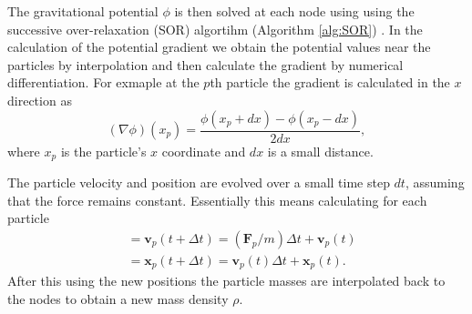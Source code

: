 \documentclass[notitlepage, 12pt]{article}
\begin{document}
The gravitational potential $\phi$ is then solved at each node using using the successive over-relaxation (SOR) algortihm (Algorithm \ref{alg:SOR}) . In the calculation of the potential gradient we obtain the potential values near the particles by interpolation and then calculate the gradient by numerical differentiation. For exmaple at the $p$th particle the gradient is calculated in the $x$ direction as
\begin{equation}
(\nabla \phi)(x_p)=\frac{\phi(x_p+dx)-\phi(x_p-dx)}{2dx},
\end{equation}
where $x_p$ is the particle's $x$ coordinate and $dx$ is a small distance.  

The particle velocity and position are evolved over a small time step $dt$, assuming that the force remains constant. Essentially this means calculating for each particle
\begin{align}
&=\mathbf{v}_p(t+\Delta t) = (\mathbf{F}_p/m)\Delta t + \mathbf{v}_p(t)\\
&=\mathbf{x}_p(t+\Delta t) = \mathbf{v}_p(t)\Delta t + \mathbf{x}_p(t).
\end{align}
After this using the new positions the particle masses are interpolated back to the nodes to obtain a new mass density $\rho$.
\end{document}
